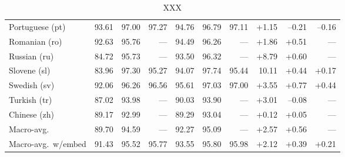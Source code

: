 \documentclass[11pt,letterpaper]{article}
\begin{document}
\begin{table}
\begin{tabular}{l|rrr|rrr|rrr}
Portuguese (pt) & 93.61 & 97.00 & 97.27 & 94.76 & 96.79 & 97.11 & +1.15 & --0.21 & --0.16\\
Romanian (ro) & 92.63 & 95.76 & --- & 94.49 & 96.26 & --- & +1.86 & +0.51 & ---\\
Russian (ru) & 84.72 & 95.73 & --- & 93.50 & 96.32 & --- & +8.79 & +0.60 & ---\\
Slovene (sl) & 83.96 & 97.30 & 95.27 & 94.07 & 97.74 & 95.44 & 10.11 & +0.44 & +0.17\\
Swedish (sv) & 92.06 & 96.26 & 96.56 & 95.61 & 97.03 & 97.00 & +3.55 & +0.77 & +0.44\\
Turkish (tr) & 87.02 & 93.98 & --- & 90.03 & 93.90 & --- & +3.01 & --0.08 & ---\\
Chinese (zh) & 89.17 & 92.99 & --- & 89.29 & 93.04 & --- & +0.12 & +0.05 & ---\\
\midrule
Macro-avg. & 89.70 & 94.59 & --- & 92.27 & 95.09 & --- & +2.57 & +0.56 & ---\\
Macro-avg.~w/embed & 91.43 & 95.52 & 95.77 & 93.55 & 95.80 & 95.98 & +2.12 & +0.39 & +0.21\\
\end{tabular}
\caption{XXX}\label{tbl:results}
\end{table}






\end{document}

